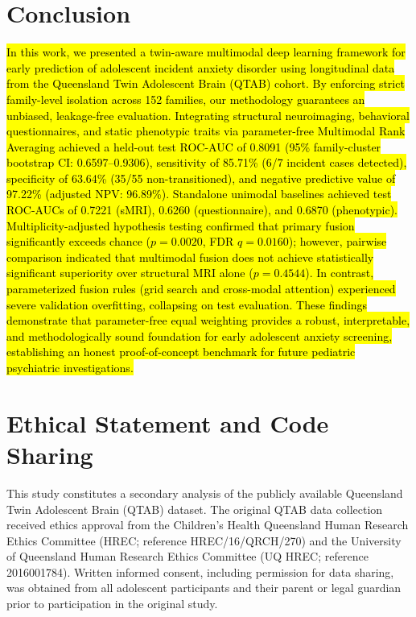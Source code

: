 \documentclass[10pt,letterpaper]{article}
\begin{document}
\section*{Conclusion}

\hl{In this work, we presented a twin-aware multimodal deep learning framework for early prediction of adolescent incident anxiety disorder using longitudinal data from the Queensland Twin Adolescent Brain (QTAB) cohort. By enforcing strict family-level isolation across 152 families, our methodology guarantees an unbiased, leakage-free evaluation. Integrating structural neuroimaging, behavioral questionnaires, and static phenotypic traits via parameter-free Multimodal Rank Averaging achieved a held-out test ROC-AUC of 0.8091 (95\% family-cluster bootstrap CI: 0.6597--0.9306), sensitivity of 85.71\% (6/7 incident cases detected), specificity of 63.64\% (35/55 non-transitioned), and negative predictive value of 97.22\% (adjusted NPV: 96.89\%). Standalone unimodal baselines achieved test ROC-AUCs of 0.7221 (sMRI), 0.6260 (questionnaire), and 0.6870 (phenotypic). Multiplicity-adjusted hypothesis testing confirmed that primary fusion significantly exceeds chance ($p = 0.0020$, FDR $q = 0.0160$); however, pairwise comparison indicated that multimodal fusion does not achieve statistically significant superiority over structural MRI alone ($p = 0.4544$). In contrast, parameterized fusion rules (grid search and cross-modal attention) experienced severe validation overfitting, collapsing on test evaluation. These findings demonstrate that parameter-free equal weighting provides a robust, interpretable, and methodologically sound foundation for early adolescent anxiety screening, establishing an honest proof-of-concept benchmark for future pediatric psychiatric investigations.}

\section*{Ethical Statement and Code Sharing}

This study constitutes a secondary analysis of the publicly available Queensland Twin Adolescent Brain (QTAB) dataset. The original QTAB data collection received ethics approval from the Children's Health Queensland Human Research Ethics Committee (HREC; reference HREC/16/QRCH/270) and the University of Queensland Human Research Ethics Committee (UQ HREC; reference 2016001784). Written informed consent, including permission for data sharing, was obtained from all adolescent participants and their parent or legal guardian prior to participation in the original study.
\end{document}
